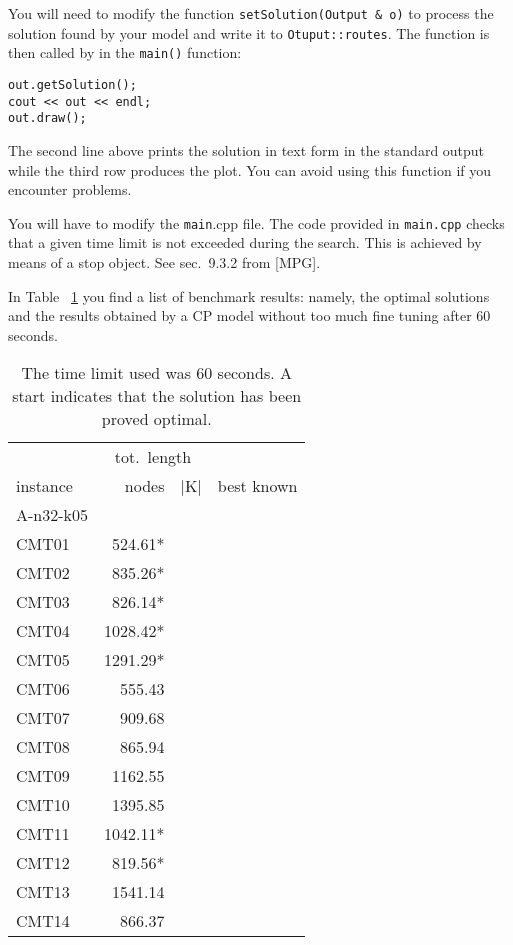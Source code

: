 You will need to modify the function \color{blue}
\verb=setSolution(Output & o)= \color{black} to
process the solution found by your model and write it to
\verb=Otuput::routes=. The function is then called by in the
\verb=main()= function:

\begin{verbatim}
out.getSolution();
cout << out << endl;
out.draw();
\end{verbatim}

The second line above prints the solution in text form in the standard
output while the third row produces the plot. You can avoid using this
function if you encounter problems.

\medskip

You will have to modify the \texttt{main}.cpp file. The code provided
in \texttt{main.cpp} checks that a given time limit is not exceeded
during the search. This is achieved by means of a stop object. See
sec.~9.3.2 from [MPG].




In Table ~\ref{results} you find a list of benchmark results:
  namely, the optimal solutions and the results obtained by a CP model
  without too much fine tuning after 60 seconds.

\begin{table}[t]
\centering 
\color{blue}
\begin{tabular}{lrrr}
 & \multicolumn{2}{c}{tot.~length} & \\
instance & nodes & |K| &best known \\
\toprule
A-n32-k05 &\\
CMT01	&524.61*  \\
CMT02	&835.26*  \\
CMT03	&826.14*  \\
CMT04	&1028.42* \\
CMT05	&1291.29* \\
CMT06	&555.43	  \\
CMT07	&909.68	  \\
CMT08	&865.94	  \\
CMT09	&1162.55  \\      
CMT10	&1395.85  \\      
CMT11	&1042.11* \\
CMT12	&819.56*  \\      
CMT13	&1541.14  \\      
CMT14	&866.37	  \\
\hline
\bottomrule
\end{tabular}
\caption{\label{results} The time limit used was 60 seconds. A start
  indicates that the solution has been proved optimal.}
\end{table}
 

